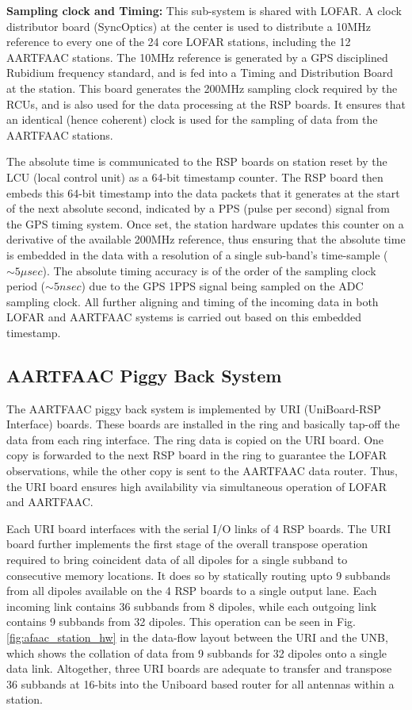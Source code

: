 \documentclass{ws-jai}
\begin{document}
\noindent \textbf  {Sampling clock and  Timing:} This sub-system is  shared with
LOFAR.  A  clock  distributor  board  (SyncOptics) at  the  center  is  used  to
distribute  a 10MHz  reference  to every  one  of the  24  core LOFAR  stations,
including the 12  AARTFAAC stations.  The 10MHz reference is  generated by a GPS
disciplined  Rubidium  frequency  standard,  and   is  fed  into  a  Timing  and
Distribution Board  at the  station.  This board  generates the  200MHz sampling
clock required by the RCUs, and is also  used for the data processing at the RSP
boards. It  ensures that  an identical  (hence coherent) clock  is used  for the
sampling of data from the AARTFAAC stations.

The absolute time is communicated to the  RSP boards on station reset by the LCU
(local control  unit) as a 64-bit  timestamp counter. The RSP  board then embeds
this 64-bit timestamp  into the data packets  that it generates at  the start of
the next absolute second, indicated by a  PPS (pulse per second) signal from the
GPS timing  system.  Once set,  the station hardware  updates this counter  on a
derivative of  the available 200MHz  reference, thus ensuring that  the absolute
time  is  embedded  in  the  data  with a  resolution  of  a  single  sub-band's
time-sample ($\sim5\mu  sec$). The absolute timing  accuracy is of the  order of
the sampling clock period ($\sim5nsec$) due to the GPS 1PPS signal being sampled
on the ADC sampling clock.  All further aligning and timing of the incoming data
in  both LOFAR  and  AARTFAAC systems  is  carried out  based  on this  embedded
timestamp.

\subsection {AARTFAAC Piggy Back System}
The AARTFAAC  piggy back system  is implemented by URI  (UniBoard-RSP Interface)
boards. These  boards are installed in  the ring and basically  tap-off the data
from each ring interface. The ring data is  copied on the URI board. One copy is
forwarded to the next RSP board in the ring to guarantee the LOFAR observations,
while the other  copy is sent to  the AARTFAAC data router. Thus,  the URI board
ensures high availability via simultaneous operation of LOFAR and AARTFAAC.

Each URI board  interfaces with the serial  I/O links of 4 RSP  boards.  The URI
board  further implements  the first  stage of  the overall  transpose operation
required  to bring  coincident  data of  all  dipoles for  a  single subband  to
consecutive memory locations.  It does so  by statically routing upto 9 subbands
from all  dipoles available on the  4 RSP boards  to a single output  lane. Each
incoming link  contains 36  subbands from  8 dipoles,  while each  outgoing link
contains  9  subbands   from  32  dipoles.   This  operation  can   be  seen  in
Fig. \ref{fig:afaac_station_hw} in the data-flow  layout between the URI and the
UNB, which  shows the collation of  data from 9  subbands for 32 dipoles  onto a
single data  link.  Altogether, three  URI boards  are adequate to  transfer and
transpose 36 subbands at 16-bits into the Uniboard based router for all antennas
within a station.\\
\end{document}
